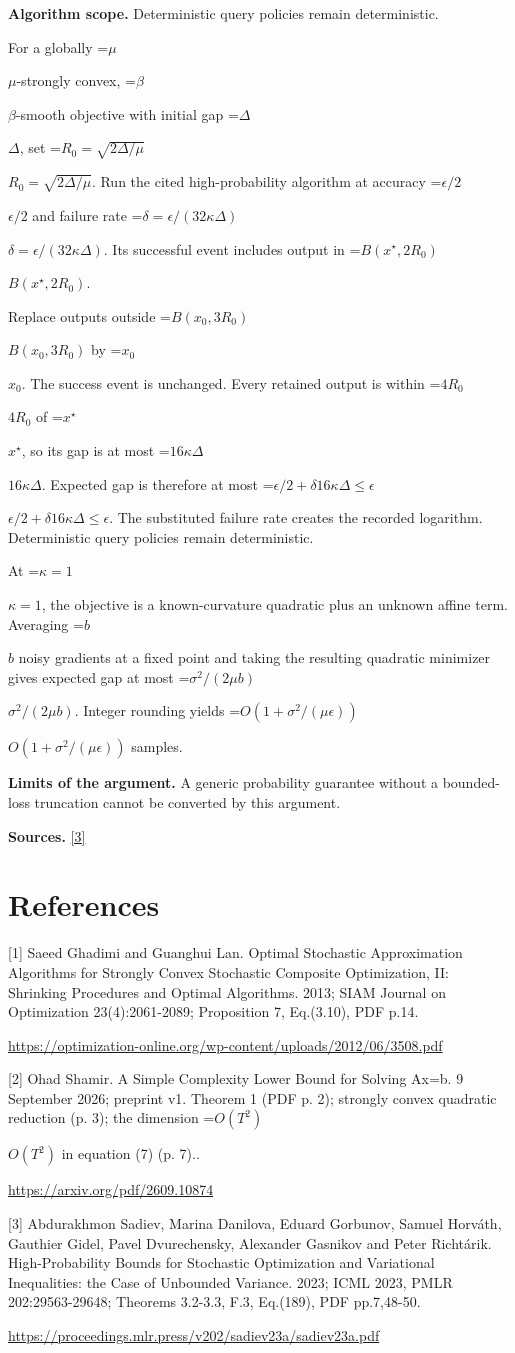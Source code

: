 \documentclass[10pt,a4paper]{article}
\newcommand{\AtlasMath}[1]{\par\begingroup\centering\setbox0=\hbox{$\displaystyle #1$}\ifdim\wd0>1.4\linewidth\typeout{ATLAS WIDE FORMULA: \the\wd0}\fi\ifdim\wd0>\linewidth\resizebox{\linewidth}{!}{\box0}\else\box0\fi\par\endgroup}
\newcommand{\AtlasInlineMath}[1]{\begingroup\setbox0=\hbox{$#1$}\ifdim\wd0>.4\linewidth\endgroup\AtlasMath{#1}\else\endgroup$#1$\fi}
\begin{document}
\textbf{Algorithm scope.} Deterministic query policies remain deterministic.

For a globally \AtlasInlineMath{\mu}-strongly convex, \AtlasInlineMath{\beta}-smooth objective with initial gap \AtlasInlineMath{\Delta}, set \AtlasInlineMath{R_0=\sqrt{2\Delta/\mu}}. Run the cited high-probability algorithm at accuracy \AtlasInlineMath{\epsilon/2} and failure rate \AtlasInlineMath{\delta=\epsilon/(32\kappa\Delta)}. Its successful event includes output in \AtlasInlineMath{B(x^\star,2R_0)}.

Replace outputs outside \AtlasInlineMath{B(x_0,3R_0)} by \AtlasInlineMath{x_0}. The success event is unchanged. Every retained output is within \AtlasInlineMath{4R_0} of \AtlasInlineMath{x^\star}, so its gap is at most \AtlasInlineMath{16\kappa\Delta}. Expected gap is therefore at most
\AtlasInlineMath{\epsilon/2+\delta16\kappa\Delta\le\epsilon}.
The substituted failure rate creates the recorded logarithm. Deterministic query policies remain deterministic.

At \AtlasInlineMath{\kappa=1}, the objective is a known-curvature quadratic plus an unknown affine term. Averaging \AtlasInlineMath{b} noisy gradients at a fixed point and taking the resulting quadratic minimizer gives expected gap at most \AtlasInlineMath{\sigma^2/(2\mu b)}. Integer rounding yields \AtlasInlineMath{O(1+\sigma^2/(\mu\epsilon))} samples.

\textbf{Limits of the argument.} A generic probability guarantee without a bounded-loss truncation cannot be converted by this argument.

\textbf{Sources.} \href{https://proceedings.mlr.press/v202/sadiev23a/sadiev23a.pdf}{[3]}

\section{References}
[1] Saeed Ghadimi and Guanghui Lan. Optimal Stochastic Approximation Algorithms for Strongly Convex Stochastic Composite Optimization, II: Shrinking Procedures and Optimal Algorithms. 2013; SIAM Journal on Optimization 23(4):2061-2089; Proposition 7, Eq.(3.10), PDF p.14.

\url{https://optimization-online.org/wp-content/uploads/2012/06/3508.pdf}

[2] Ohad Shamir. A Simple Complexity Lower Bound for Solving Ax=b. 9 September 2026; preprint v1. Theorem 1 (PDF p. 2); strongly convex quadratic reduction (p. 3); the dimension \AtlasInlineMath{O(T^2)} in equation (7) (p. 7)..

\url{https://arxiv.org/pdf/2609.10874}

[3] Abdurakhmon Sadiev, Marina Danilova, Eduard Gorbunov, Samuel Horváth, Gauthier Gidel, Pavel Dvurechensky, Alexander Gasnikov and Peter Richtárik. High-Probability Bounds for Stochastic Optimization and Variational Inequalities: the Case of Unbounded Variance. 2023; ICML 2023, PMLR 202:29563-29648; Theorems 3.2-3.3, F.3, Eq.(189), PDF pp.7,48-50.

\url{https://proceedings.mlr.press/v202/sadiev23a/sadiev23a.pdf}
\end{document}

